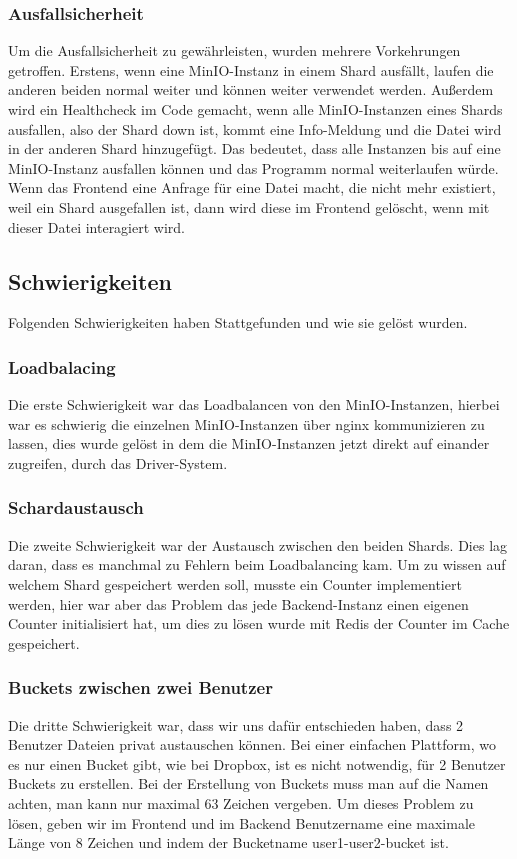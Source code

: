 \documentclass[12pt]{report}
\begin{document}
			\subsubsection{Ausfallsicherheit}
				Um die Ausfallsicherheit zu gewährleisten, wurden mehrere Vorkehrungen getroffen. Erstens, wenn eine MinIO-Instanz in einem Shard ausfällt, laufen die anderen beiden normal weiter und können weiter verwendet werden. Außerdem wird ein Healthcheck im Code gemacht, wenn alle MinIO-Instanzen eines Shards ausfallen, also der Shard down ist, kommt eine Info-Meldung und die Datei wird in der anderen Shard hinzugefügt. Das bedeutet, dass alle Instanzen bis auf eine MinIO-Instanz ausfallen können und das Programm normal weiterlaufen würde. Wenn das Frontend eine Anfrage für eine Datei macht, die nicht mehr existiert, weil ein Shard ausgefallen ist, dann wird diese im Frontend gelöscht, wenn mit dieser Datei interagiert wird.
				
			\subsection{Schwierigkeiten}
				Folgenden Schwierigkeiten haben Stattgefunden und wie sie gelöst wurden.
				
				\subsubsection{Loadbalacing}
					Die erste Schwierigkeit war das Loadbalancen von den MinIO-Instanzen, hierbei war es schwierig die einzelnen MinIO-Instanzen über nginx kommunizieren zu lassen, dies wurde gelöst in dem die MinIO-Instanzen jetzt direkt auf einander zugreifen, durch das Driver-System.
			
				\subsubsection{Schardaustausch}
					Die zweite Schwierigkeit war der Austausch zwischen den beiden Shards. Dies lag daran, dass es manchmal zu Fehlern beim Loadbalancing kam. Um zu wissen auf welchem Shard gespeichert werden soll, musste ein Counter implementiert werden, hier war aber das Problem das jede Backend-Instanz einen eigenen Counter initialisiert hat, um dies zu lösen wurde mit Redis der Counter im Cache gespeichert.
				
				\subsubsection{Buckets zwischen zwei Benutzer}
					Die dritte Schwierigkeit war, dass wir uns dafür entschieden haben, dass 2 Benutzer Dateien privat austauschen können. Bei einer einfachen Plattform, wo es nur einen Bucket gibt, wie bei Dropbox, ist es nicht notwendig, für 2 Benutzer Buckets zu erstellen. Bei der Erstellung von Buckets muss man auf die Namen achten, man kann nur maximal 63 Zeichen vergeben. Um dieses Problem zu lösen, geben wir im Frontend und im Backend Benutzername eine maximale Länge von 8 Zeichen und indem der Bucketname user1-user2-bucket ist.
			
\end{document}
